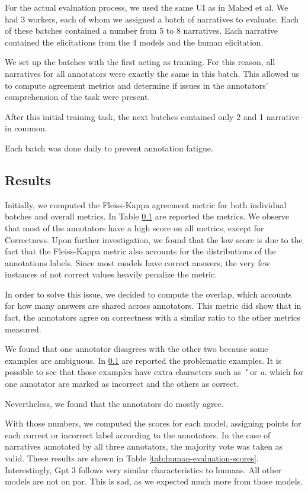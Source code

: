 For the actual evaluation process, we used the same UI as in Mahed et al. 
We had 3 workers, each of whom we assigned a batch of narratives to evaluate. 
Each of these batches contained a number from 5 to 8 narratives. Each narrative contained the elicitations from the 4 models and the human elicitation. 

We set up the batches with the first acting as training. For this reason, all narratives for all annotators were exactly the same in this batch. This allowed us to compute agreement metrics and determine if issues in the annotators' comprehension of the task were present.

After this initial training task, the next batches contained only 2 and 1 narrative in common. 

Each batch was done daily to prevent annotation fatigue.

\subsection{Results}
Initially, we computed the Fleiss-Kappa \cite{fleiss} agreement metric for both individual batches and overall metrics. In Table \ref{} are reported the metrics. We observe that most of the annotators have a high score on all metrics, except for Correctness. Upon further investigation, we found that the low score is due to the fact that the Fleiss-Kappa metric also accounts for the distributions of the annotations labels. Since most models have correct answers, the very few instances of not correct values heavily penalize the metric.

In order to solve this issue, we decided to compute the overlap, which accounts for how many answers are shared across annotators. This metric did show that in fact, the annotators agree on correctness with a similar ratio to the other metrics measured.

We found that one annotator disagrees with the other two because some examples are ambiguous. In \ref{} are reported the problematic examples. It is possible to see that those examples have extra characters such as \emph{"} or \emph{a.} which for one annotator are marked as incorrect and the others as correct.

Nevertheless, we found that the annotators do mostly agree.


With those numbers, we computed the scores for each model, assigning points for each correct or incorrect label according to the annotators. In the case of narratives annotated by all three annotators, the majority vote was taken as valid. These results are shown in Table \ref{tab:human-evaluation-scores}.
Interestingly, Gpt 3 follows very similar characteristics to humans. All other models are not on par. This is sad, as we expected much more from those models.

